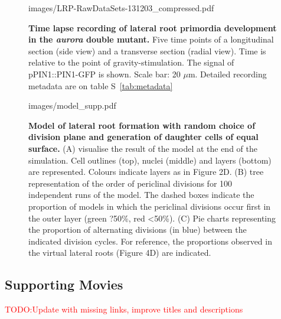 \documentclass[11pt,a4paper, final]{article}
\newcommand{\TODO}[1]{
\textcolor{red}{TODO:#1}
}
\begin{document}
%
\begin{figure}[htbp]
	\begin{overpic}[width=1.\linewidth]{images/LRP-RawDataSets-131203_compressed.pdf}
	\end{overpic}
\caption[ Time lapse recording of  lateral root primordia development in the \emph{aurora} double mutant.]
{{\bf Time lapse recording of  lateral root primordia development in the \emph{aurora} double mutant.} Five time points of a longitudinal section (side view) and a transverse section (radial view). Time is relative to the point of gravity-stimulation. The signal of pPIN1::PIN1-GFP  is shown. Scale bar: 20 $\mu$m. Detailed recording metadata are on table S~\ref{tab:metadata}}
\label{fig:aurora}
\end{figure}
%
\clearpage
%
\begin{figure}[htbp]
	\begin{overpic}[width=1.\linewidth]{images/model_supp.pdf}
	\end{overpic}
\caption[Model of lateral root formation with random choice of division plane and  generation of  daughter cells of equal surface.]
{{\bf Model of lateral root formation with random choice of division plane and  generation of  daughter cells of equal surface.} (A) visualise the result of the model at the end of the simulation. Cell outlines (top), nuclei (middle) and layers (bottom) are represented. Colours indicate layers as in Figure 2D. (B)  tree representation of the order of periclinal divisions for 100 independent runs of the model. The dashed boxes indicate the proportion of models in which the periclinal divisions occur first in the outer layer (green ?50\%, red <50\%). (C) Pie charts representing the proportion of alternating divisions (in blue) between the indicated division cycles. For reference, the proportions observed in the virtual lateral roots (Figure 4D) are indicated. }
\label{fig:modelrandea}
\end{figure}
%

\clearpage
\subsection{Supporting Movies}
\TODO{Update with missing links, improve titles and descriptions}
\end{document}
